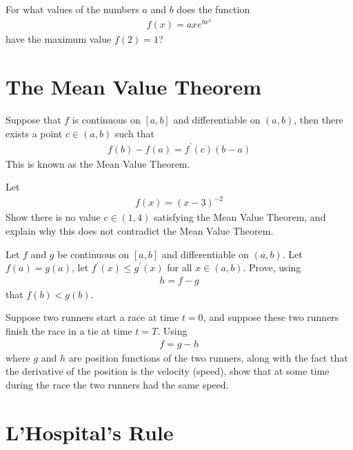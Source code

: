 \begin{exercise}
For what values of the numbers $a$ and $b$ does the function
\begin{align*}
    f(x) = axe^{bx^{2}}
\end{align*}
have the maximum value $f(2) = 1$?
\end{exercise}

\newpage
\section{The Mean Value Theorem}

\begin{theorem}
Suppose that $f$ is continuous on $[a, b]$ and differentiable on $(a, b)$, then there exists a point $c \in (a, b)$ such that
\begin{align*}
    f(b) - f(a) = f^{'}(c)(b - a)
\end{align*}
This is known as the Mean Value Theorem.
\end{theorem}

\begin{exercise}
Let 
\begin{align*}
    f(x) = (x-3)^{-2}
\end{align*}
Show there is no value $c \in (1,4)$ satisfying the Mean Value Theorem, and explain why this does not contradict the Mean Value Theorem. 
\end{exercise}

\begin{exercise}
Let $f$ and $g$ be continuous on $[a, b]$ and differentiable on $(a, b)$. Let $f(a) = g(a)$, let $f^{'}(x) \leq g^{'}(x)$ for all $x \in (a, b)$. Prove, using
\begin{align*}
    h = f - g
\end{align*}
that $f(b) < g(b)$.
\end{exercise}

\begin{exercise}
Suppose two runners start a race at time $t = 0$, and suppose these two runners finish the race in a tie at time $t = T$. Using
\begin{align*}
    f = g - h
\end{align*}
where $g$ and $h$ are position functions of the two runners, along with the fact that the derivative of the position is the velocity (speed), show that at some time during the race the two runners had the same speed.
\end{exercise}

\newpage
\section{L'Hospital's Rule}

